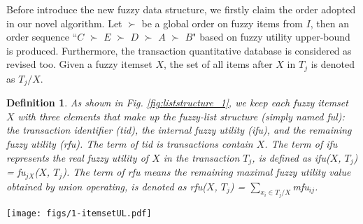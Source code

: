 \documentclass[journal]{IEEEtran}
\newtheorem{definition}{Definition}[section]
\begin{document}
\rm Before introduce the new fuzzy data structure, we firstly claim the order adopted in our novel algorithm. Let $\succ$ be a global order on fuzzy items from $I$, then an order sequence ``$C$ $\succ$ $E$ $\succ$ $D$ $\succ$ $A$ $\succ$ $B$" based on fuzzy utility upper-bound is produced. Furthermore, the transaction quantitative database is considered as revised too. Given a fuzzy itemset $X$, the set of all items after $X$ in $T_j$ is denoted as $T_j / X$.

\begin{definition}
	\rm  As shown in Fig. \ref{fig:liststructure_1}, we keep each fuzzy itemset $X$ with three elements that make up the fuzzy-list structure (simply named \textit{ful}): the transaction identifier (\textit{tid}), the internal fuzzy utility (\textit{ifu}), and the remaining fuzzy utility (\textit{rfu}). The term of \textit{tid} is transactions contain $X$. The term of \textit{ifu} represents the real fuzzy utility of $X$ in the transaction $T_j$, is defined as \textit{ifu}($X$, $T_j$) = \textit{fu}$_{jX}$($X$, $T_j$). The term of \textit{rfu} means the remaining maximal fuzzy utility value obtained by union operating, is denoted as \textit{rfu}($X$, $T_j$) = $\sum_{x_i \in T_j / X}$\textit{mfu}$_{ij}$.
\end{definition}


\begin{figure*}[hbtp]
	\centering
	\texttt{[image: figs/1-itemsetUL.pdf]}
	\caption{The constructed fuzzy-list structures of 1-itemsets.}
	\label{fig:liststructure_1}
\end{figure*}
\end{document}
